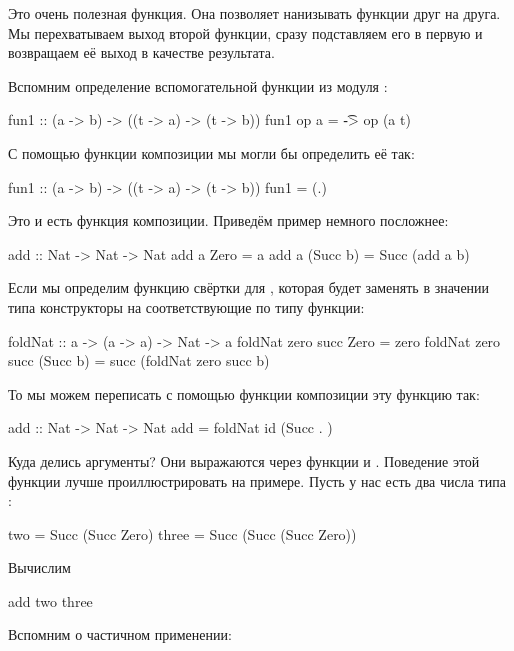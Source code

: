 Это очень полезная функция. Она позволяет нанизывать
функции друг на друга. Мы перехватываем выход второй функции,
сразу подставляем его в первую и возвращаем её выход в качестве
результата. 

Вспомним определение вспомогательной функции  из
модуля :

\begin{code}
fun1 :: (a -> b) -> ((t -> a) -> (t -> b))
fun1 op a = \t -> op (a t)
\end{code}

С помощью функции композиции мы могли бы определить её так:

\begin{code}
fun1 :: (a -> b) -> ((t -> a) -> (t -> b))
fun1 = (.)
\end{code}

Это и есть функция композиции. Приведём пример немного посложнее:

\begin{code}
add :: Nat -> Nat -> Nat
add  a  Zero     = a
add  a  (Succ b) = Succ (add a b)
\end{code}

Если мы определим функцию свёртки для , которая
будет заменять в значении типа  конструкторы на 
соответствующие по типу функции:

\begin{code}
foldNat :: a -> (a -> a) -> Nat -> a
foldNat zero succ Zero     = zero
foldNat zero succ (Succ b) = succ (foldNat zero succ b)
\end{code}

То мы можем переписать с помощью функции композиции эту функцию так:

\begin{code}
add :: Nat -> Nat -> Nat
add = foldNat  id  (Succ . )
\end{code}

Куда делись аргументы? Они выражаются через функции 
и . Поведение этой функции лучше проиллюстрировать 
на примере. Пусть у нас есть два числа типа :

\begin{code}
two     = Succ (Succ Zero)
three   = Succ (Succ (Succ Zero))
\end{code}

Вычислим 

\begin{code}
add two three
\end{code}

Вспомним о частичном применении:

